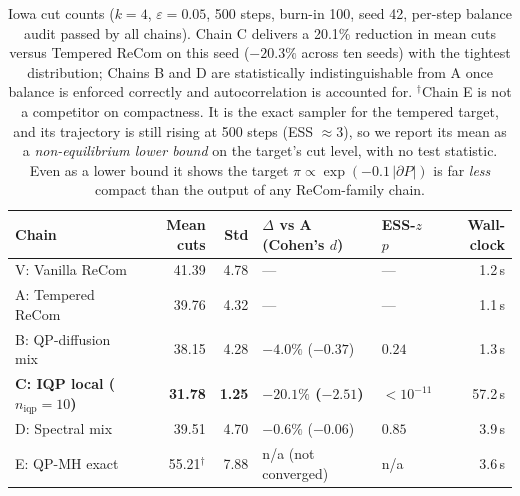 \documentclass[11pt]{article}
\begin{document}
\begin{table}[H]
\centering
\small
\begin{tabular}{lrrllr}
\toprule
Chain & Mean cuts & Std & $\Delta$ vs A (Cohen's $d$) & ESS-$z$ $p$ & Wall-clock \\
\midrule
V: Vanilla ReCom         & 41.39 & 4.78 & ---                & ---     & 1.2\,s \\
A: Tempered ReCom        & 39.76 & 4.32 & ---                & ---     & 1.1\,s \\
B: QP-diffusion mix      & 38.15 & 4.28 & $-4.0\%$ ($-0.37$) & $0.24$  & 1.3\,s \\
\textbf{C: IQP local ($n_{\mathrm{iqp}} = 10$)}
                         & \textbf{31.78} & \textbf{1.25}
                         & \textbf{$-20.1\%$ ($-2.51$)} & $< 10^{-11}$ & 57.2\,s \\
D: Spectral mix          & 39.51 & 4.70 & $-0.6\%$ ($-0.06$) & $0.85$  & 3.9\,s \\
E: QP-MH exact           & 55.21$^{\dagger}$ & 7.88 & n/a (not converged) & n/a & 3.6\,s \\
\bottomrule
\end{tabular}
\caption{Iowa cut counts ($k = 4$, $\varepsilon = 0.05$, 500 steps,
  burn-in 100, seed 42, per-step balance audit passed by all chains).
  Chain C delivers a 20.1\% reduction in mean cuts versus Tempered
  ReCom on this seed ($-20.3\%$ across ten seeds) with the tightest
  distribution; Chains B and D are
  statistically indistinguishable from A once balance is enforced
  correctly and autocorrelation is accounted for. $^{\dagger}$Chain E
  is not a competitor on compactness. It is the exact sampler for the
  tempered target, and its trajectory is still rising at 500 steps
  (ESS $\approx 3$), so we report its mean as a \emph{non-equilibrium
  lower bound} on the target's cut level, with no test statistic.
  Even as a lower bound it shows the target
  $\pi \propto \exp(-0.1\,|\partial P|)$ is far \emph{less} compact
  than the output of any ReCom-family chain.}\label{tab:iowa-headline}
\end{table}
\end{document}
